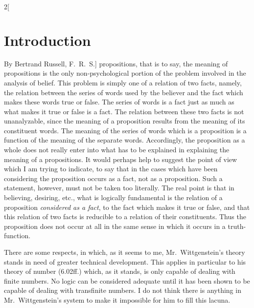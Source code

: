 \documentclass[oneside,openany,12pt]{book}
\begin{document}
\begin{multicols}{2}[\section*{Introduction}By Bertrand Russell, F.\ R.\ S.]
propositions, that is to say, the meaning of propositions is the only non-psychological portion of the problem involved in the analysis of belief. This problem is simply one of a relation of two facts, namely, the relation between the series of words used by the believer and the fact which makes these words true or false. The series of words is a fact just as much as what makes it true or false is a fact. The relation between these two facts is not unanalyzable, since the meaning of a proposition results from the meaning of its constituent words. The meaning of the series of words which is a proposition is a function of the meaning of the separate words. Accordingly, the proposition as a whole does not really enter into what has to be explained in explaining the meaning of a propositions. It would perhaps help to suggest the point of view which I am trying to indicate, to say that in the cases which have been considering the proposition occurs as a fact, not as a proposition. Such a statement, however, must not be taken too literally. The real point is that in believing, desiring, etc., what is logically fundamental is the relation of a proposition \emph{considered as a fact}, to the fact which makes it true or false, and that this relation of two facts is reducible to a relation of their constituents. Thus the proposition does not occur at all in the same sense in which it occurs in a truth-function.

There are some respects, in which, as it seems to me, Mr.\ Wittgenstein's theory stands in need of greater technical development. This applies in particular to his theory of number (6.02ff.) which, as it stands, is only capable of dealing with finite numbers. No logic can be considered adequate until it has been shown to be capable of dealing with transfinite numbers. I do not think there is anything in Mr.\ Wittgenstein's system to make it impossible for him to fill this lacuna.


\end{multicols}
\end{document}
